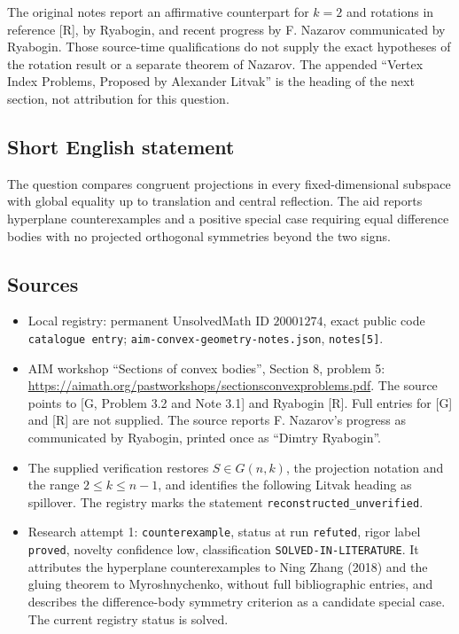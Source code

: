 \documentclass[11pt]{article}
\begin{document}
The original notes report an affirmative counterpart for \(k=2\) and rotations in reference [R], by Ryabogin, and recent progress by F. Nazarov communicated by Ryabogin. Those source-time qualifications do not supply the exact hypotheses of the rotation result or a separate theorem of Nazarov. The appended ``Vertex Index Problems, Proposed by Alexander Litvak'' is the heading of the next section, not attribution for this question.
\subsection{Short English statement}
The question compares congruent projections in every fixed-dimensional subspace with global equality up to translation and central reflection. The aid reports hyperplane counterexamples and a positive special case requiring equal difference bodies with no projected orthogonal symmetries beyond the two signs.
\subsection{Sources}
\begin{itemize}
\item Local registry: permanent UnsolvedMath ID \(20001274\), exact public code \texttt{catalogue entry}; \texttt{aim-convex-geometry-notes.json}, \texttt{notes[5]}.
\item AIM workshop ``Sections of convex bodies'', Section 8, problem 5: \url{https://aimath.org/pastworkshops/sectionsconvexproblems.pdf}. The source points to [G, Problem 3.2 and Note 3.1] and Ryabogin [R]. Full entries for [G] and [R] are not supplied. The source reports F. Nazarov's progress as communicated by Ryabogin, printed once as ``Dimtry Ryabogin''.
\item The supplied verification restores \(S\in G(n,k)\), the projection notation and the range \(2\leq k\leq n-1\), and identifies the following Litvak heading as spillover. The registry marks the statement \texttt{reconstructed\_unverified}.
\item Research attempt 1: \texttt{counterexample}, status at run \texttt{refuted}, rigor label \texttt{proved}, novelty confidence low, classification \texttt{SOLVED-IN-LITERATURE}. It attributes the hyperplane counterexamples to Ning Zhang (2018) and the gluing theorem to Myroshnychenko, without full bibliographic entries, and describes the difference-body symmetry criterion as a candidate special case. The current registry status is solved.
\end{itemize}
\end{document}
